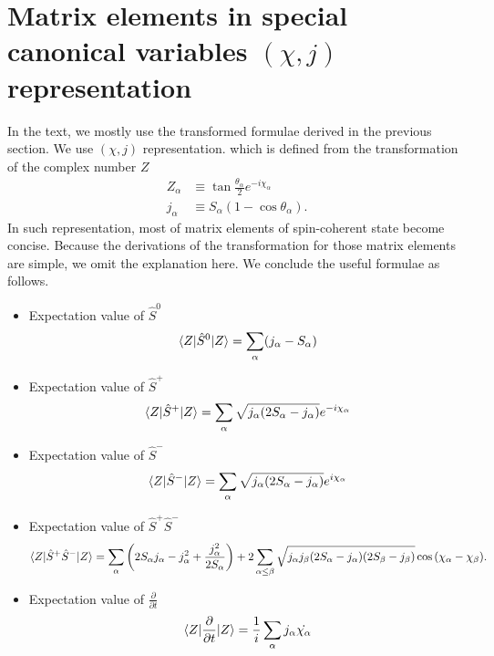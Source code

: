 \documentclass[11pt]{book} %
\begin{document}
\section{Matrix elements in special canonical variables $(\chi,j)$ representation}
\label{formula2}
In the text, we mostly use the transformed formulae derived in the previous section.
We use $(\chi,j)$ representation. which is defined from the transformation of the complex number $Z$
\begin{align}
  Z_{\alpha} &\equiv \tan{\frac{\theta_{\alpha}}{2}}e^{-i\chi_{\alpha}} \\
  j_{\alpha} &\equiv S_{\alpha}(1-\cos{\theta}_{\alpha}) .
\end{align}
In such representation, most of matrix elements of spin-coherent state become concise. Because the derivations of the transformation for those matrix elements are simple, we omit the explanation here. We conclude the useful formulae as follows.
\begin{framed}
  \begin{itemize}
 \item Expectation value of $\hat{S}^0$
\begin{equation}
     \braket{Z|\hat{S}^0|Z} = \sum_{\alpha} (j_{\alpha}-S_{\alpha})
\end{equation}
 \item Expectation value of $\hat{S}^+$
\begin{equation}
     \braket{Z|\hat{S}^+|Z} = \sum_{\alpha} \sqrt{j_{\alpha}(2S_{\alpha}-j_{\alpha})}e^{-i\chi_{\alpha}}
\end{equation}
 \item Expectation value of $\hat{S}^-$
\begin{equation}
     \braket{Z|\hat{S}^-|Z} = \sum_{\alpha} \sqrt{j_{\alpha}(2S_{\alpha}-j_{\alpha})}e^{i\chi_{\alpha}}
\end{equation}
 \item Expectation value of $\hat{S}^+\hat{S}^-$
\begin{equation}
    \braket{Z|\hat{S}^+\hat{S}^-|Z} = \sum_{\alpha} \left( 2S_{\alpha} j_{\alpha} - j_{\alpha}^2 +\frac{j_{\alpha}^2}{2S_{\alpha}} \right) 
+ 2\sum_{\alpha\le \beta} \sqrt{j_{\alpha}j_{\beta}(2S_{\alpha}-j_{\alpha})(2S_{\beta}-j_{\beta})}\cos{(\chi_{\alpha}-\chi_{\beta})}   .
\end{equation}
 \item Expectation value of $\frac{\partial}{\partial t}$
\begin{equation}
       \braket{Z|\frac{\partial}{\partial t}|Z} = \frac{1}{i}\sum_{\alpha} j_{\alpha} \dot{\chi_{\alpha}}
	\label{ddt2}
\end{equation}
\end{itemize}
\end{framed}
\end{document}
